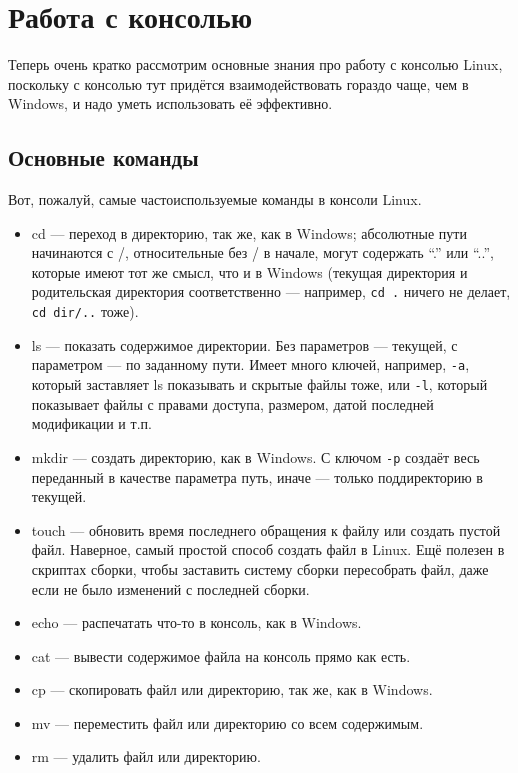 \documentclass{../../text-style}
\begin{document}
\section{Работа с консолью}

Теперь очень кратко рассмотрим основные знания про работу с консолью Linux, поскольку с консолью тут придётся взаимодействовать гораздо чаще, чем в Windows, и надо уметь использовать её эффективно.

\subsection{Основные команды}

Вот, пожалуй, самые частоиспользуемые команды в консоли Linux.

\begin{itemize}
    \item cd --- переход в директорию, так же, как в Windows; абсолютные пути начинаются с /, относительные без / в начале, могут содержать \enquote{.} или \enquote{..}, которые имеют тот же смысл, что и в Windows (текущая директория и родительская директория соответственно --- например, \verb|cd .| ничего не делает, \verb|cd dir/..| тоже).
    \item ls --- показать содержимое директории. 
        Без параметров --- текущей, с параметром --- по заданному пути. 
        Имеет много ключей, например, \verb|-a|, который заставляет ls показывать и скрытые файлы тоже, или \verb|-l|, который показывает файлы с правами доступа, размером, датой последней модификации и т.п.
    \item mkdir --- создать директорию, как в Windows.
        С ключом \verb|-p| создаёт весь переданный в качестве параметра путь, иначе --- только поддиректорию в текущей.
    \item touch --- обновить время последнего обращения к файлу или создать пустой файл.
        Наверное, самый простой способ создать файл в Linux.
        Ещё полезен в скриптах сборки, чтобы заставить систему сборки пересобрать файл, даже если не было изменений с последней сборки.
    \item echo --- распечатать что-то в консоль, как в Windows.
    \item cat --- вывести содержимое файла на консоль прямо как есть.
    \item cp --- скопировать файл или директорию, так же, как в Windows.
    \item mv --- переместить файл или директорию со всем содержимым.
    \item rm --- удалить файл или директорию. 

\end{itemize}
\end{document}
